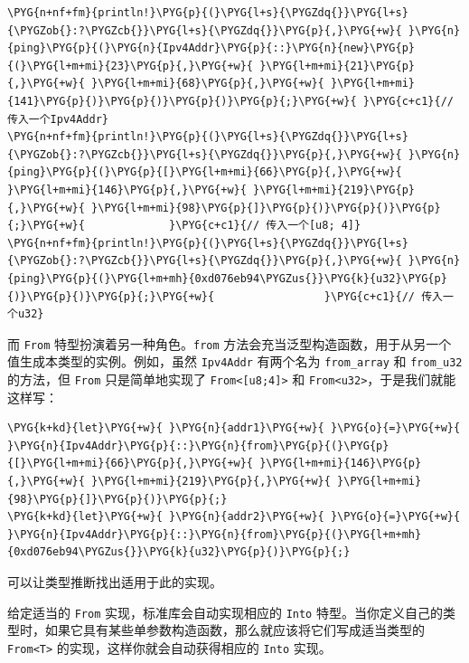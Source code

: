 \begin{Verbatim}[commandchars=\\\{\},breaklines=true,breakanywhere=true,fontsize=\codefont,xleftmargin=17bp]
\PYG{n+nf+fm}{println!}\PYG{p}{(}\PYG{l+s}{\PYGZdq{}}\PYG{l+s}{\PYGZob{}:?\PYGZcb{}}\PYG{l+s}{\PYGZdq{}}\PYG{p}{,}\PYG{+w}{ }\PYG{n}{ping}\PYG{p}{(}\PYG{n}{Ipv4Addr}\PYG{p}{::}\PYG{n}{new}\PYG{p}{(}\PYG{l+m+mi}{23}\PYG{p}{,}\PYG{+w}{ }\PYG{l+m+mi}{21}\PYG{p}{,}\PYG{+w}{ }\PYG{l+m+mi}{68}\PYG{p}{,}\PYG{+w}{ }\PYG{l+m+mi}{141}\PYG{p}{)}\PYG{p}{)}\PYG{p}{)}\PYG{p}{;}\PYG{+w}{ }\PYG{c+c1}{// 传入一个Ipv4Addr}
\PYG{n+nf+fm}{println!}\PYG{p}{(}\PYG{l+s}{\PYGZdq{}}\PYG{l+s}{\PYGZob{}:?\PYGZcb{}}\PYG{l+s}{\PYGZdq{}}\PYG{p}{,}\PYG{+w}{ }\PYG{n}{ping}\PYG{p}{(}\PYG{p}{[}\PYG{l+m+mi}{66}\PYG{p}{,}\PYG{+w}{ }\PYG{l+m+mi}{146}\PYG{p}{,}\PYG{+w}{ }\PYG{l+m+mi}{219}\PYG{p}{,}\PYG{+w}{ }\PYG{l+m+mi}{98}\PYG{p}{]}\PYG{p}{)}\PYG{p}{)}\PYG{p}{;}\PYG{+w}{             }\PYG{c+c1}{// 传入一个[u8; 4]}
\PYG{n+nf+fm}{println!}\PYG{p}{(}\PYG{l+s}{\PYGZdq{}}\PYG{l+s}{\PYGZob{}:?\PYGZcb{}}\PYG{l+s}{\PYGZdq{}}\PYG{p}{,}\PYG{+w}{ }\PYG{n}{ping}\PYG{p}{(}\PYG{l+m+mh}{0xd076eb94\PYGZus{}}\PYG{k}{u32}\PYG{p}{)}\PYG{p}{)}\PYG{p}{;}\PYG{+w}{                 }\PYG{c+c1}{// 传入一个u32}
\end{Verbatim}

而 \texttt{From} 特型扮演着另一种角色。\texttt{from} 方法会充当泛型构造函数，用于从另一个值生成本类型的实例。例如，虽然 \texttt{Ipv4Addr} 有两个名为 \texttt{from\_array} 和 \texttt{from\_u32} 的方法，但 \texttt{From} 只是简单地实现了 \texttt{From<[u8;4]>} 和 \texttt{From<u32>}，于是我们就能这样写：

\begin{Verbatim}[commandchars=\\\{\},breaklines=true,breakanywhere=true,fontsize=\codefont,xleftmargin=17bp]
\PYG{k+kd}{let}\PYG{+w}{ }\PYG{n}{addr1}\PYG{+w}{ }\PYG{o}{=}\PYG{+w}{ }\PYG{n}{Ipv4Addr}\PYG{p}{::}\PYG{n}{from}\PYG{p}{(}\PYG{p}{[}\PYG{l+m+mi}{66}\PYG{p}{,}\PYG{+w}{ }\PYG{l+m+mi}{146}\PYG{p}{,}\PYG{+w}{ }\PYG{l+m+mi}{219}\PYG{p}{,}\PYG{+w}{ }\PYG{l+m+mi}{98}\PYG{p}{]}\PYG{p}{)}\PYG{p}{;}
\PYG{k+kd}{let}\PYG{+w}{ }\PYG{n}{addr2}\PYG{+w}{ }\PYG{o}{=}\PYG{+w}{ }\PYG{n}{Ipv4Addr}\PYG{p}{::}\PYG{n}{from}\PYG{p}{(}\PYG{l+m+mh}{0xd076eb94\PYGZus{}}\PYG{k}{u32}\PYG{p}{)}\PYG{p}{;}
\end{Verbatim}

可以让类型推断找出适用于此的实现。

给定适当的 \texttt{From} 实现，标准库会自动实现相应的 \texttt{Into} 特型。当你定义自己的类型时，如果它具有某些单参数构造函数，那么就应该将它们写成适当类型的 \texttt{From<T>} 的实现，这样你就会自动获得相应的 \texttt{Into} 实现。

